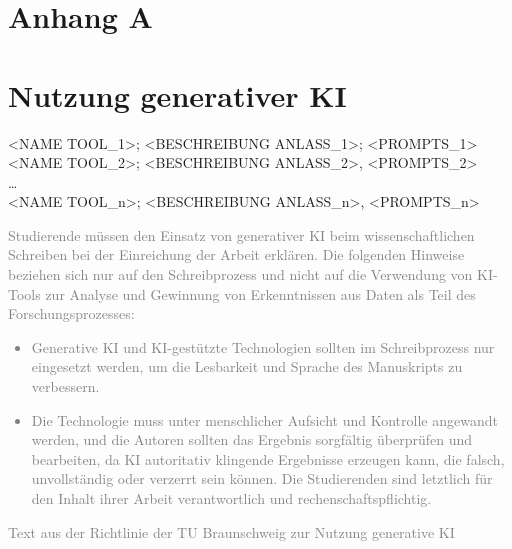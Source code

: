 \chapter{Anhang A}
\label{chap:anhang_a}




\chapter{Nutzung generativer KI}
\label{chap:anhang_b}

<NAME TOOL\_1>; <BESCHREIBUNG ANLASS\_1>; <PROMPTS\_1>\\
<NAME TOOL\_2>; <BESCHREIBUNG ANLASS\_2>, <PROMPTS\_2>\\
…\\
<NAME TOOL\_n>; <BESCHREIBUNG ANLASS\_n>, <PROMPTS\_n>\\


\textcolor{gray}{
	Studierende müssen den Einsatz von generativer KI beim wissenschaftlichen Schreiben bei
	der Einreichung der Arbeit erklären. Die folgenden Hinweise beziehen sich nur auf den
	Schreibprozess und nicht auf die Verwendung von KI-Tools zur Analyse und Gewinnung von
	Erkenntnissen aus Daten als Teil des Forschungsprozesses:
	\begin{itemize}
		\item Generative KI und KI-gestützte Technologien sollten im Schreibprozess nur
		eingesetzt werden, um die Lesbarkeit und Sprache des Manuskripts zu verbessern.
		\item Die Technologie muss unter menschlicher Aufsicht und Kontrolle angewandt werden,
		und die Autoren sollten das Ergebnis sorgfältig überprüfen und bearbeiten, da KI
		autoritativ klingende Ergebnisse erzeugen kann, die falsch, unvollständig oder
		verzerrt sein können. Die Studierenden sind letztlich für den Inhalt ihrer Arbeit
		verantwortlich und rechenschaftspflichtig.
	\end{itemize}
	Text aus der Richtlinie der TU Braunschweig zur Nutzung generative KI
}

